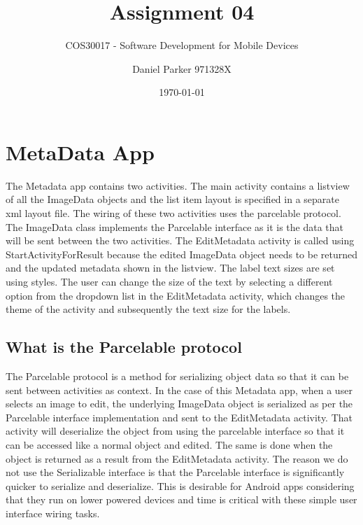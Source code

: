 \documentclass[11pt,english,numbers=endperiod,parskip=half]{scrartcl}
\title{Assignment 04}
\subtitle{COS30017 - Software Development for Mobile Devices}
\author{Daniel Parker 971328X}
\date{\today}
\begin{document}
\maketitle
\thispagestyle{empty}

\section{MetaData App}
\raggedright
The Metadata app contains two activities. The main activity contains a listview of all the ImageData objects and the list item layout is specified in a separate xml layout file. The wiring of these two activities uses the parcelable protocol. The ImageData class implements the Parcelable interface as it is the data that will be sent between the two activities. The EditMetadata activity is called using StartActivityForResult because the edited ImageData object needs to be returned and the updated metadata shown in the listview. The label text sizes are set using styles. The user can change the size of the text by selecting a different option from the dropdown list in the EditMetadata activity, which changes the theme of the activity and subsequently the text size for the labels.
\subsection{What is the Parcelable protocol}
\raggedright
The Parcelable protocol is a method for serializing object data so that it can be sent between activities as context. In the case of this Metadata app, when a user selects an image to edit, the underlying ImageData object is serialized as per the Parcelable interface implementation and sent to the EditMetadata activity. That activity will deserialize the object from using the parcelable interface so that it can be accessed like a normal object and edited. The same is done when the object is returned as a result from the EditMetadata activity. The reason we do not use the Serializable interface is that the Parcelable interface is significantly quicker to serialize and deserialize. This is desirable for Android apps considering that they run on lower powered devices and time is critical with these simple user interface wiring tasks.
\end{document}
